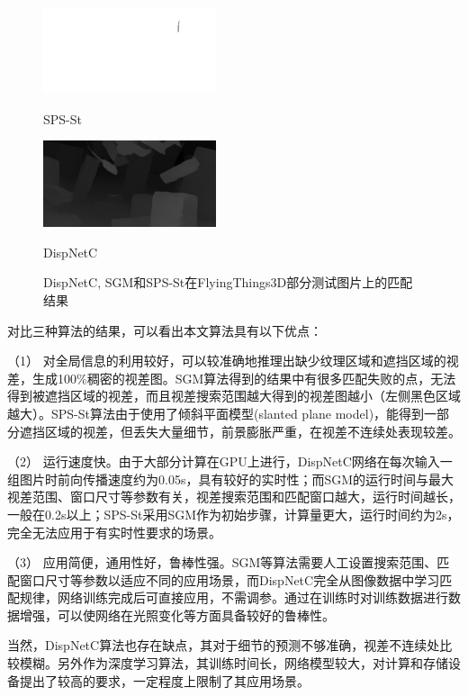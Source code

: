 \begin{figure}[htbp]
\begin{minipage}{0.3\linewidth}
		\centerline{\includegraphics[width=2in]{figures/cmp_ft3d/sps_039}}
		\vspace{-10pt}
		\centerline{SPS-St}
	\end{minipage}
	\hfill
	\begin{minipage}{0.3\linewidth}
		\centerline{\includegraphics[width=2in]{figures/cmp_ft3d/pred_039}}
		\vspace{-10pt}
		\centerline{DispNetC}
	\end{minipage}
	\caption{DispNetC, SGM和SPS-St在FlyingThings3D部分测试图片上的匹配结果}
	\label{fig:4_3_ft3d_cmp_result}
\end{figure}

对比三种算法的结果，可以看出本文算法具有以下优点：

（1）
对全局信息的利用较好，可以较准确地推理出缺少纹理区域和遮挡区域的视差，生成100\%稠密的视差图。SGM算法得到的结果中有很多匹配失败的点，无法得到被遮挡区域的视差，而且视差搜索范围越大得到的视差图越小（左侧黑色区域越大）。SPS-St算法由于使用了倾斜平面模型(slanted plane model)，能得到一部分遮挡区域的视差，但丢失大量细节，前景膨胀严重，在视差不连续处表现较差。

（2）
运行速度快。由于大部分计算在GPU上进行，DispNetC网络在每次输入一组图片时前向传播速度约为0.05s，具有较好的实时性；而SGM的运行时间与最大视差范围、窗口尺寸等参数有关，视差搜索范围和匹配窗口越大，运行时间越长，一般在0.2s以上；SPS-St采用SGM作为初始步骤，计算量更大，运行时间约为2s，完全无法应用于有实时性要求的场景。

（3）
应用简便，通用性好，鲁棒性强。SGM等算法需要人工设置搜索范围、匹配窗口尺寸等参数以适应不同的应用场景，而DispNetC完全从图像数据中学习匹配规律，网络训练完成后可直接应用，不需调参。通过在训练时对训练数据进行数据增强，可以使网络在光照变化等方面具备较好的鲁棒性。

当然，DispNetC算法也存在缺点，其对于细节的预测不够准确，视差不连续处比较模糊。另外作为深度学习算法，其训练时间长，网络模型较大，对计算和存储设备提出了较高的要求，一定程度上限制了其应用场景。

